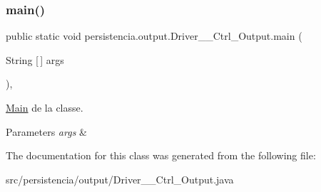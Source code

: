 \subsubsection{\texorpdfstring{main()}{main()}}
{\footnotesize\ttfamily public static void persistencia.\+output.\+Driver\+\_\+\+\_\+\+Ctrl\+\_\+\+Output.\+main (\begin{DoxyParamCaption}\item[{String \mbox{[}$\,$\mbox{]}}]{args }\end{DoxyParamCaption})\hspace{0.3cm}{\ttfamily [inline]}, {\ttfamily [static]}}



\hyperlink{classMain}{Main} de la classe. 


\begin{DoxyParams}{Parameters}
{\em args} & \\
\hline
\end{DoxyParams}


The documentation for this class was generated from the following file\+:\begin{DoxyCompactItemize}
\item 
src/persistencia/output/Driver\+\_\+\+\_\+\+Ctrl\+\_\+\+Output.\+java\end{DoxyCompactItemize}
